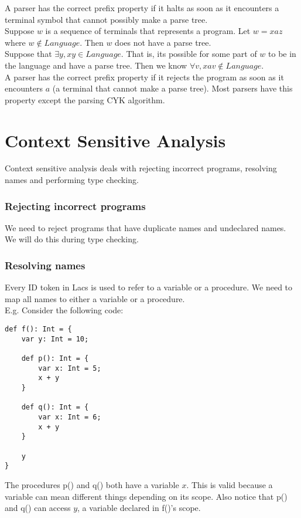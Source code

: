 \documentclass[12pt, letterpaper]{article}
\begin{document}
A parser has the correct prefix property if it halts as soon as it encounters a terminal symbol that cannot possibly make a parse tree.\\

Suppose \(w\) is a sequence of terminals that represents a program. Let \(w = xaz\) where \(w \not\in Language\). Then \(w\) does not have a parse tree.\\

Suppose that \(\exists y, xy \in Language\). That is, its possible for some part of \(w\) to be in the language and have a parse tree. Then we know \(\forall v, xav \not\in Language\).\\

A parser has the correct prefix property if it rejects the program as soon as it encounters \(a\) (a terminal that cannot make a parse tree). Most parsers have this property except the parsing CYK algorithm.

\newpage

\section{Context Sensitive Analysis}
Context sensitive analysis deals with rejecting incorrect programs, resolving names and performing type checking.

\subsubsection{Rejecting incorrect programs}
We need to reject programs that have duplicate names and undeclared names. We will do this during type checking.

\subsubsection{Resolving names}
Every ID token in Lacs is used to refer to a variable or a procedure. We need to map all names to either a variable or a procedure.\\

E.g. Consider the following code:
\begin{lstlisting}
def f(): Int = {
	var y: Int = 10;
	
	def p(): Int = {
		var x: Int = 5;
		x + y
	}
	
	def q(): Int = {
		var x: Int = 6;
		x + y	
	}
	
	y
}
\end{lstlisting}
The procedures p() and q() both have a variable \(x\). This is valid because a variable can mean different things depending on its scope. Also notice that p() and q() can access \(y\), a variable declared in f()'s scope.\\
\end{document}
